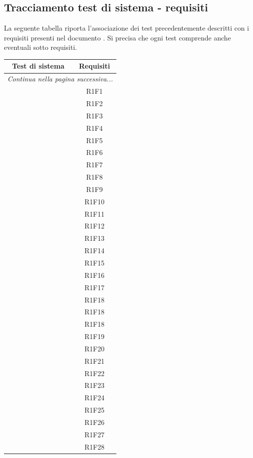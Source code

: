 \subsection{Tracciamento test di sistema - requisiti}
La seguente tabella riporta l'associazione dei test precedentemente descritti con i requisiti presenti nel documento . Si precisa che ogni test comprende anche eventuali sotto requisiti.
\resetCTS
\begin{center}
	\begin{longtable}{|c|c|}
	\hline
	\rowcolor{lighter-grayer}
	\textbf{Test di sistema} & \textbf{Requisiti} \\
	\hline
	\endfirsthead
	\hline
	\multicolumn{2}{|c|}{\textit{Continua nella pagina successiva...}} \\
	\hline
	\endfoot
	\endlastfoot

	\hline
	 & R1F1 \\
	 & R1F2 \\
	 & R1F3 \\
	 & R1F4 \\
	 & R1F5 \\
	 & R1F6 \\
	 & R1F7 \\
	 & R1F8 \\
	 & R1F9 \\
	 & R1F10 \\

	 & R1F11  \\
	 & R1F12 \\
	 & R1F13 \\
	 & R1F14 \\
	 & R1F15 \\
	 & R1F16 \\
	 & R1F17 \\
	 & R1F18 \\
	 & R1F18 \\
	 & R1F18 \\

	 & R1F19 \\
	 & R1F20 \\
	 & R1F21 \\
	 & R1F22 \\
	 & R1F23 \\
	 & R1F24 \\
	 & R1F25 \\
	 & R1F26 \\
	 & R1F27 \\
	 & R1F28 \\
	\hline

	\end{longtable}
\end{center}



